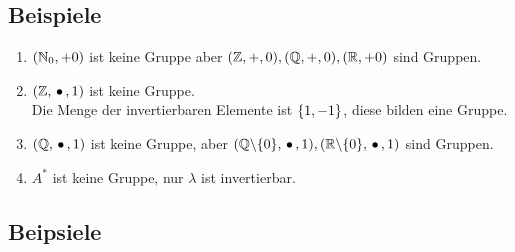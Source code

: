 \subsection{Beispiele}

\begin{enumerate}
	
	\item
	$(\mathbb{N}_0, + 0)$ ist keine Gruppe aber $(\mathbb{Z}, +, 0), (\mathbb{Q}, +, 0), (\mathbb{R}, + 0)$ sind Gruppen.
	
	\item
	$(\mathbb{Z}, \,{\bullet}\,, 1)$ ist keine Gruppe.
	\\ Die Menge der invertierbaren Elemente ist $\left\{1, -1\right\}$, diese bilden eine Gruppe.
	
	\item
	$(\mathbb{Q}, \,{\bullet}\,, 1)$ ist keine Gruppe, aber $(\mathbb{Q} \backslash \{0\}, \,{\bullet}\,, 1), (\mathbb{R} \backslash \{0\}, \,{\bullet}\,, 1)$ sind Gruppen.
	
	\item
	$A^*$ ist keine Gruppe, nur $\lambda$ ist invertierbar.
	
\end{enumerate}

\subsection{Beipsiele}

